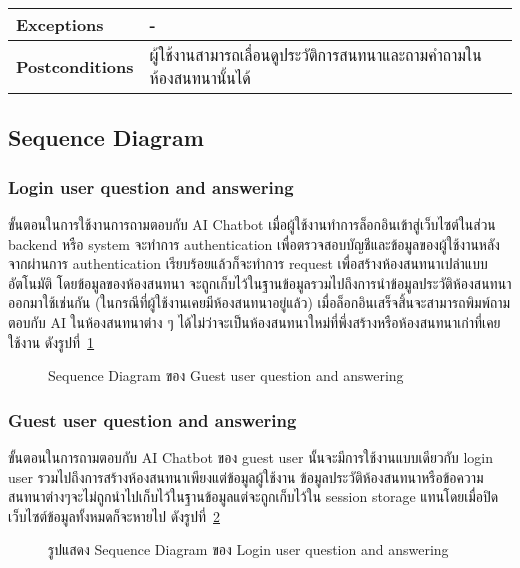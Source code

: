 \documentclass[12pt,oneside,openright,a4paper]{cpe-thai-project}
\begin{document}
\begin{table}[!h]
\begin{tabular}{|l|ll|}
\textbf{Exceptions}        & \multicolumn{2}{l|}{-}                                                                                                                                                                                                                                                                                             \\ \hline
\textbf{Postconditions}    & \multicolumn{2}{l|}{ผู้ใช้งานสามารถเลื่อนดูประวัติการสนทนาและถามคำถามในห้องสนทนานั้นได้}                                                                                                                                                                                                                           \\ \hline
\end{tabular}
\end{table}

\subsection{Sequence Diagram}
\subsubsection{Login user question and answering}

ขั้นตอนในการใช้งานการถามตอบกับ AI Chatbot เมื่อผู้ใช้งานทำการล็อกอินเข้าสู่เว็บไซต์ในส่วน backend หรือ system จะทำการ authentication เพื่อตรวจสอบบัญชีและข้อมูลของผู้ใช้งานหลังจากผ่านการ authentication เรียบร้อยแล้วก็จะทำการ request เพื่อสร้างห้องสนทนาเปล่าแบบอัตโนมัติ โดยข้อมูลของห้องสนทนา จะถูกเก็บไว้ในฐานข้อมูลรวมไปถึงการนำข้อมูลประวัติห้องสนทนาออกมาใช้เช่นกัน (ในกรณีที่ผู้ใช้งานเคยมีห้องสนทนาอยู่แล้ว) เมื่อล็อกอินเสร็จสิ้นจะสามารถพิมพ์ถามตอบกับ AI ในห้องสนทนาต่าง ๆ ได้ไม่ว่าจะเป็นห้องสนทนาใหม่ที่พึ่งสร้างหรือห้องสนทนาเก่าที่เคยใช้งาน ดังรูปที่~\ref{fig:F3.22}
\begin{figure}[!h]\centering
\setlength{\fboxrule}{0mm}
\caption{Sequence Diagram ของ Guest user question and answering}\label{fig:F3.22}
\end{figure}

\subsubsection{Guest user question and answering}

ขั้นตอนในการถามตอบกับ AI Chatbot ของ guest user นั้นจะมีการใช้งานแบบเดียวกับ login user รวมไปถึงการสร้างห้องสนทนาเพียงแต่ข้อมูลผู้ใช้งาน ข้อมูลประวัติห้องสนทนาหรือข้อความสนทนาต่างๆจะไม่ถูกนำไปเก็บไว้ในฐานข้อมูลแต่จะถูกเก็บไว้ใน session storage แทนโดยเมื่อปิดเว็บไซต์ข้อมูลทั้งหมดก็จะหายไป ดังรูปที่~\ref{fig:F3.23}
\begin{figure}[!h]\centering
\setlength{\fboxrule}{0mm}
\caption{รูปแสดง Sequence Diagram ของ Login user question and answering}\label{fig:F3.23}
\end{figure}
\end{document}
